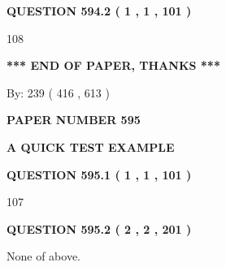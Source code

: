 \documentclass[12pt]{article}
\begin{document}
{\textbf{\Large{QUESTION
594.2 
 ( 1 , 1 , 101 )
}}}
  
  
 
 
\noindent{}

108
 
 
   
   
 \vspace{0.2in}
 
   
   
   
   
\vspace{1.0in} 
{\textbf{\large{ *** END OF PAPER, THANKS *** }}} 
   
   
\hspace{1.0in} By: 
 239 ( 416 ,  613 )
   
   
   
   
\newpage 
\setcounter{page}{ 
   595001 } 
   
   
   
   
 {\textbf{ \Large{ PAPER NUMBER  595  }}}
   
   
\vspace{0.2in}
   
   
   
   
   
   
 \vspace{0.2in}
{\LARGE {\textbf{ A QUICK TEST EXAMPLE}}}
   
   
  
\vspace{0.2in}
  
{\textbf{\Large{QUESTION
595.1 
 ( 1 , 1 , 101 )
}}}
  
  
 
 
\noindent{}

107
 
 
  
\vspace{0.2in}
  
{\textbf{\Large{QUESTION
595.2 
 ( 2 , 2 , 201 )
}}}
  
  
 
 
\noindent{}
 
 
 None of above.
 
 
 
\end{document}
